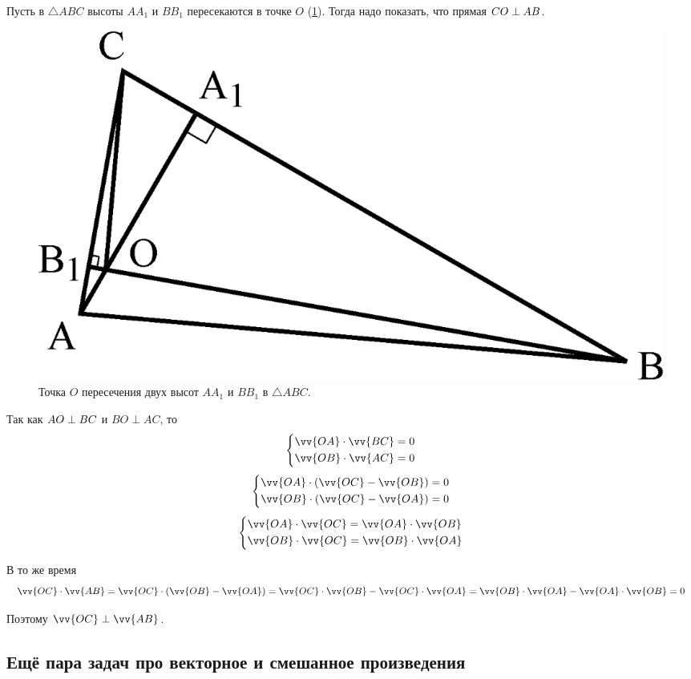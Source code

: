 \documentclass[a4paper,12pt]{article}
\begin{document}
  \begin{solution}
    Пусть в $\triangle ABC$ высоты $AA_1$ и $BB_1$ пересекаются в точке $O$ (\ref{fig:triangle-with-two-hs}).
    Тогда надо показать, что прямая $CO \hm\perp AB$.
    
    \begin{figure}[h]
      \centering
    
      \includegraphics[width=0.5\columnwidth]{triangle-with-two-hs}
    
      \caption{Точка $O$ пересечения двух высот $AA_1$ и $BB_1$ в $\triangle ABC$.}
      \label{fig:triangle-with-two-hs}
    \end{figure}
  
    Так как $AO \hm\perp BC$ и $BO \perp AC$, то
    \[
      \left\{
        \begin{aligned}
          &\vv{OA} \cdot \vv{BC} = 0\\
          &\vv{OB} \cdot \vv{AC} = 0
        \end{aligned}
      \right.
    \]
    \[
      \left\{
        \begin{aligned}
          &\vv{OA} \cdot (\vv{OC} - \vv{OB}) = 0\\
          &\vv{OB} \cdot (\vv{OC} - \vv{OA}) = 0
        \end{aligned}
      \right.
    \]
    \[
      \left\{
        \begin{aligned}
          &\vv{OA} \cdot \vv{OC} = \vv{OA} \cdot \vv{OB}\\
          &\vv{OB} \cdot \vv{OC} = \vv{OB} \cdot \vv{OA}
        \end{aligned}
      \right.
    \]
    
    В то же время
    \[
      \vv{OC} \cdot \vv{AB} = \vv{OC} \cdot (\vv{OB} - \vv{OA}) = \vv{OC} \cdot \vv{OB} - \vv{OC} \cdot \vv{OA}
        = \vv{OB} \cdot \vv{OA} - \vv{OA} \cdot \vv{OB} = 0
    \]
    
    Поэтому $\vv{OC} \hm\perp \vv{AB}$.
  \end{solution}
  
  
  
  \subsection{Ещё пара задач про векторное и смешанное произведения}
  
\end{document}

